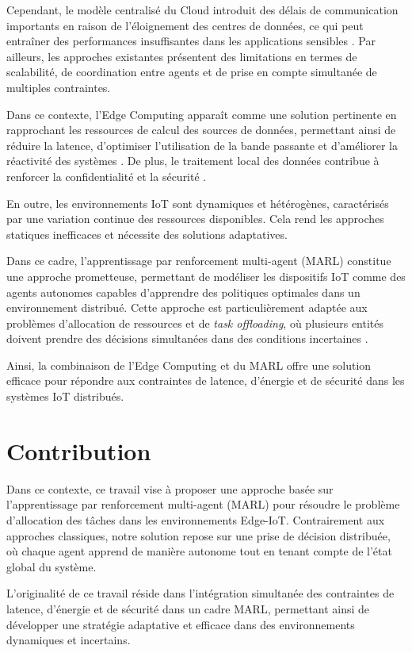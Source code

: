\documentclass[12pt,a4paper]{report}
\begin{document}
Cependant, le modèle centralisé du Cloud introduit des délais de communication importants en raison de l’éloignement des centres de données, ce qui peut entraîner des performances insuffisantes dans les applications sensibles \cite{kang2017neurosurgeon}. Par ailleurs, les approches existantes présentent des limitations en termes de scalabilité, de coordination entre agents et de prise en compte simultanée de multiples contraintes.

Dans ce contexte, l’Edge Computing apparaît comme une solution pertinente en rapprochant les ressources de calcul des sources de données, permettant ainsi de réduire la latence, d’optimiser l’utilisation de la bande passante et d’améliorer la réactivité des systèmes \cite{mecsurvey}. De plus, le traitement local des données contribue à renforcer la confidentialité et la sécurité \cite{baccour2024}.

En outre, les environnements IoT sont dynamiques et hétérogènes, caractérisés par une variation continue des ressources disponibles. Cela rend les approches statiques inefficaces et nécessite des solutions adaptatives.

Dans ce cadre, l’apprentissage par renforcement multi-agent (MARL) constitue une approche prometteuse, permettant de modéliser les dispositifs IoT comme des agents autonomes capables d’apprendre des politiques optimales dans un environnement distribué. Cette approche est particulièrement adaptée aux problèmes d’allocation de ressources et de \textit{task offloading}, où plusieurs entités doivent prendre des décisions simultanées dans des conditions incertaines \cite{liu2020marl}.

Ainsi, la combinaison de l’Edge Computing et du MARL offre une solution efficace pour répondre aux contraintes de latence, d’énergie et de sécurité dans les systèmes IoT distribués.

\section{Contribution}

Dans ce contexte, ce travail vise à proposer une approche basée sur l’apprentissage par renforcement multi-agent (MARL) pour résoudre le problème d’allocation des tâches dans les environnements Edge-IoT. Contrairement aux approches classiques, notre solution repose sur une prise de décision distribuée, où chaque agent apprend de manière autonome tout en tenant compte de l’état global du système.

L’originalité de ce travail réside dans l’intégration simultanée des contraintes de latence, d’énergie et de sécurité dans un cadre MARL, permettant ainsi de développer une stratégie adaptative et efficace dans des environnements dynamiques et incertains.
\end{document}
